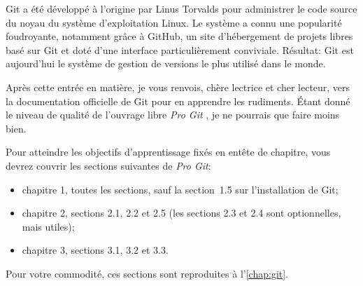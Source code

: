 Git a été développé à l'origine par Linus Torvalds pour
administrer le code source du noyau du système d'exploitation Linux.
Le système a connu une popularité foudroyante, notamment grâce à
GitHub, un site d'hébergement de projets libres basé sur Git et doté
d'une interface particulièrement conviviale. Résultat: Git est
aujourd'hui le système de gestion de versions le plus utilisé dans le
monde.

Après cette entrée en matière, je vous renvois, chère lectrice et cher
lecteur, vers la documentation officielle de Git pour en apprendre les
rudiments. Étant donné le niveau de qualité de l'ouvrage libre
\emph{Pro Git} \citep{ProGit:2e:2014}, je ne pourrais que faire moins
bien.

Pour atteindre les objectifs d'apprentissage fixés en entête de
chapitre, vous devrez couvrir les sections suivantes de \emph{Pro Git}:
\begin{itemize}
\item chapitre 1, toutes les sections, sauf la section~1.5 sur
  l'installation de Git;
\item chapitre 2, sections 2.1, 2.2 et 2.5 (les sections 2.3 et 2.4 sont
  optionnelles, mais utiles);
\item chapitre 3, sections 3.1, 3.2 et 3.3.
\end{itemize}
Pour votre commodité, ces sections sont reproduites à
l'\autoref{chap:git}.

